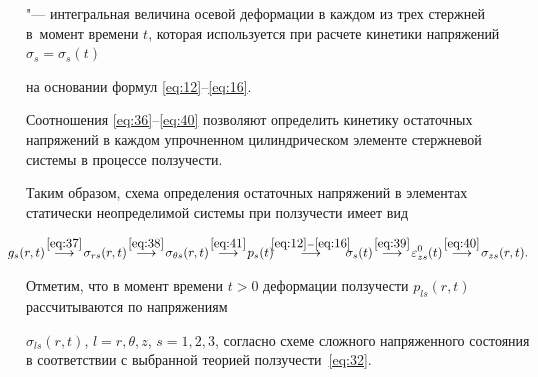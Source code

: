"--- интегральная величина осевой деформации в каждом из трех стержней в~момент времени $t$, которая используется при расчете кинетики напряжений $\sigma_s = \sigma_s (t)$%

на основании формул \eqref{eq:12}--\eqref{eq:16}.

Соотношения \eqref{eq:36}--\eqref{eq:40} позволяют определить кинетику остаточных напряжений в каждом упрочненном цилиндрическом элементе стержневой системы в процессе ползучести.



Таким образом, схема определения остаточных напряжений в элементах статически неопределимой системы при ползучести имеет вид

\begin{gather}\!\!\!\!\!\!\!\!\!

g_s (r, t) \!

\stackrel{  \eqref{eq:37}}{\longrightarrow} 

\!

\sigma_{r s}(r, t) \!

\stackrel{  \eqref{eq:38}}{\longrightarrow}\! \sigma_{\theta s}(r, t) \!

\stackrel{  \eqref{eq:41}}{\longrightarrow} \! p_s  (t)

\!\!\!\stackrel{  \eqref{eq:12}-\eqref{eq:16}}{\longrightarrow}  \!\!\!\!



\sigma_s (t)  \!

\stackrel{  \eqref{eq:39}}{\longrightarrow} \! \varepsilon_{z s}^0(t)\!

\stackrel{  \eqref{eq:40}}{\longrightarrow} \! \sigma_{z s}(r, t).

\label{eq:42}

\end{gather}



Отметим, что в момент времени $t>0$ деформации ползучести $p_{l s}(r, t)$ рассчитываются по напряжениям 

$\sigma_{l s}(r, t)$, $l = r, \theta, z$, $s=1,2,3$, согласно схеме сложного напряженного состояния в соответствии с выбранной теорией ползучести~\eqref{eq:32}.



\smallskip



